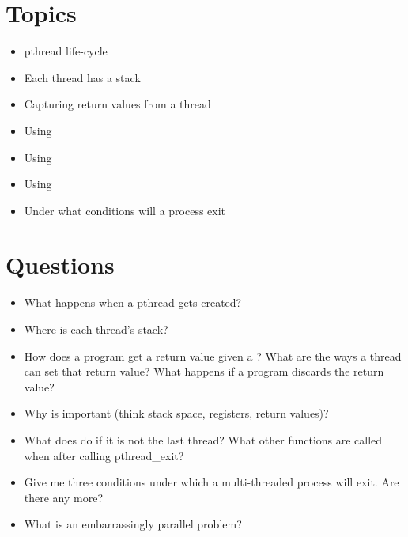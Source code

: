 \section{Topics}

\begin{itemize}
\tightlist
\item
pthread life-cycle
\item
Each thread has a stack
\item
Capturing return values from a thread
\item
Using 
\item
Using 
\item
Using 
\item
Under what conditions will a process exit
\end{itemize}

\section{Questions}

\begin{itemize}
\tightlist
\item
What happens when a pthread gets created?
\item
Where is each thread's stack?
\item
How does a program get a return value given a ? What are the ways a thread can set that return value? What happens if a program discards the return value?
\item
Why is  important (think stack space, registers, return values)?
\item
What does  do if it is not the last thread? What other functions are called when after calling pthread\_exit?
\item
Give me three conditions under which a multi-threaded process will exit. Are there any more?
\item
What is an embarrassingly parallel problem?
\end{itemize}



